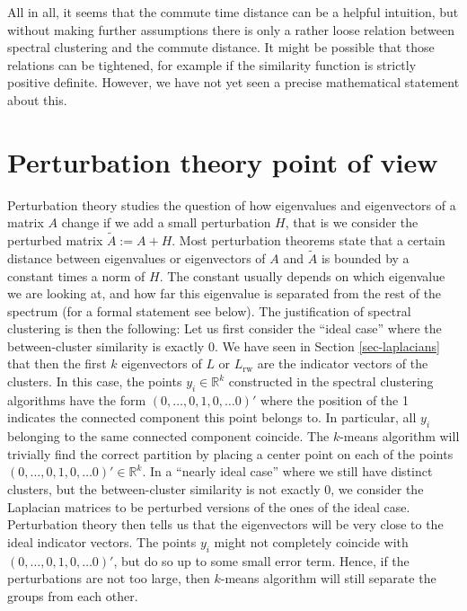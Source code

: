 \documentclass{article}
\newcommand{\RR}{\mathbb{R}}
\newcommand{\R}{\RR}
\newcommand{\Lun}{L}
\newcommand{\Lrw}{L_{\text{rw}}}
\begin{document}
All in all, it seems that the commute time distance can be a helpful
intuition, but without making further assumptions there is only a
rather loose relation between spectral clustering and the commute
distance. It might be possible that those relations can be tightened,
for example if the similarity function is strictly positive
definite. However, we have not yet seen a precise mathematical
statement about this.





%
\section{Perturbation theory point of view} \label{sec-perturbation}
%

Perturbation theory studies the question of how eigenvalues and
eigenvectors of a matrix $A$ change if we add a small perturbation
$H$, that is we consider the perturbed matrix $\tilde A := A + H$.
Most perturbation theorems state that a certain distance between
eigenvalues or eigenvectors of $A$ and $\tilde A$ is bounded by a
constant times a norm of $H$. The constant usually depends on which
eigenvalue we are looking at, and how far this eigenvalue is separated
from the rest of
the spectrum (for a formal statement see below). 
%
The justification of spectral clustering is then the following: Let us
first consider the ``ideal case'' where the between-cluster similarity
is exactly 0. We have seen in Section \ref{sec-laplacians} that then
the first $k$ eigenvectors of $\Lun$ or $\Lrw$ are the indicator
vectors of the clusters. In this case, the points $y_i \in \R^k$
constructed in the spectral clustering algorithms have the form
$(0,\hdots,0,1,0,\hdots0)'$ where the position of the 1 indicates the
connected component this point belongs to. In particular, all $y_i$
belonging to the same connected component coincide. The $k$-means
algorithm will trivially find the correct partition by placing a
center point on each of the points $(0,\hdots,0,1,0,\hdots0)' \in
\R^k$.
%
In a ``nearly ideal case'' where we still have distinct clusters, but
the between-cluster similarity is not exactly 0, we consider the
Laplacian matrices to be perturbed versions of the ones of the ideal
case. Perturbation theory then tells us that the eigenvectors will be
very close to the ideal indicator vectors. The points $y_i$ might not
completely coincide with $(0,\hdots,0,1,0,\hdots0)'$, but do so up to
some small error term. Hence, if the perturbations are not too large,
then $k$-means algorithm will still separate the groups from each
other. \\
\end{document}

